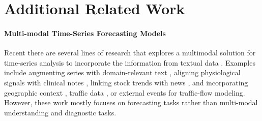 \documentclass[twoside]{article}
\begin{document}
\section{Additional Related Work}
\label{app:related_work}

\paragraph{Multi-modal Time-Series Forecasting Models} 
Recent there are several lines of research that explores a multimodal solution for time-series analysis to incorporate the information from textual data \citep{liu2025can}. Examples include augmenting series with domain-relevant text \citep{jin2023time,liu2025timecma,liu2024autotimes,liu2025calf}, aligning physiological signals with clinical notes \citep{wan2024meit}, linking stock trends with news \citep{wang2024news,tavakoli2025multi}, and incorporating geographic context \citep{chen2024terra}, traffic data \citep{zhang2024bjtt}, or external events \citep{han2024event} for traffic-flow modeling. However, these work mostly focuses on forecasting tasks rather than multi-modal understanding and diagnostic tasks.
\end{document}
